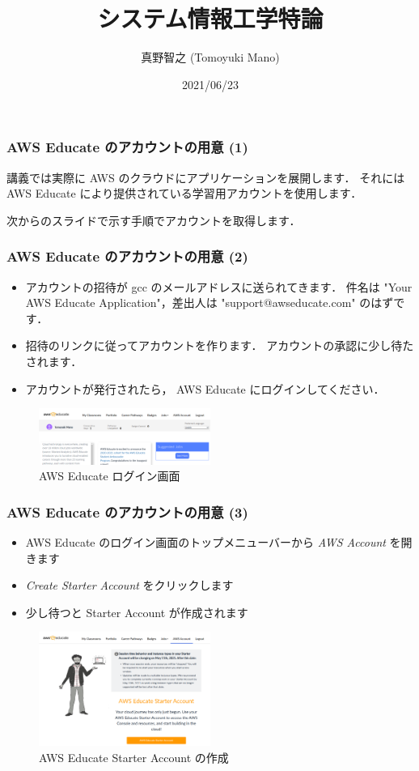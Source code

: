 \documentclass[unicode,11pt]{beamer}
\title{システム情報工学特論}
\author{真野智之 (Tomoyuki Mano)}
\institute[OIST]{Okinawa Institute of Science and Technology}
\date{2021/06/23}
\begin{document}
\frame{\titlepage}

\begin{frame}
\frametitle{AWS Educate のアカウントの用意 (1)}

講義では実際に AWS のクラウドにアプリケーションを展開します．
それには AWS Educate により提供されている学習用アカウントを使用します．


次からのスライドで示す手順でアカウントを取得します．

\end{frame}

\begin{frame}
\frametitle{AWS Educate のアカウントの用意 (2)}
\begin{itemize}
    \item アカウントの招待が gcc のメールアドレスに送られてきます．
    件名は "Your AWS Educate Application"，差出人は "support@awseducate.com" のはずです．
    \item 招待のリンクに従ってアカウントを作ります．
    アカウントの承認に少し待たされます．
    \item アカウントが発行されたら， AWS Educate にログインしてください．
\end{itemize}

\begin{figure}
    \centering
    \includegraphics[width=0.5\textwidth]{imgs/aws_educate_screenshot1.png}
    \caption{AWS Educate ログイン画面}
\end{figure}

\end{frame}

\begin{frame}
\frametitle{AWS Educate のアカウントの用意 (3)}

\begin{itemize}
    \item AWS Educate のログイン画面のトップメニューバーから \emph{AWS Account} を開きます
    \item \emph{Create Starter Account} をクリックします
    \item 少し待つと Starter Account が作成されます
\end{itemize}

\begin{figure}
    \centering
    \includegraphics[width=0.5\textwidth]{imgs/aws_educate_screenshot2.png}
    \caption{AWS Educate Starter Account の作成}
\end{figure}

\end{frame}
\end{document}
